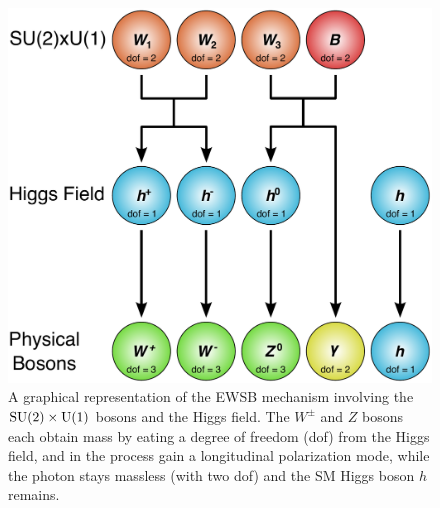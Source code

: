 \begin{figure}[htbp]
  \centering
  \includegraphics[width=.65\textwidth]{figs/theory/higgs_mechanism_dof}
  \caption{A graphical representation of the EWSB mechanism involving the $\textrm{SU}(2)\times\textrm{U}(1)$ bosons and the Higgs field.  The $W^\pm$ and $Z$ bosons each obtain mass by eating a degree of freedom (dof) from the Higgs field, and in the process gain a longitudinal polarization mode, while the photon stays massless (with two dof) and the SM Higgs boson $h$ remains.}
  \label{fig:higgs_dof}
\end{figure}
